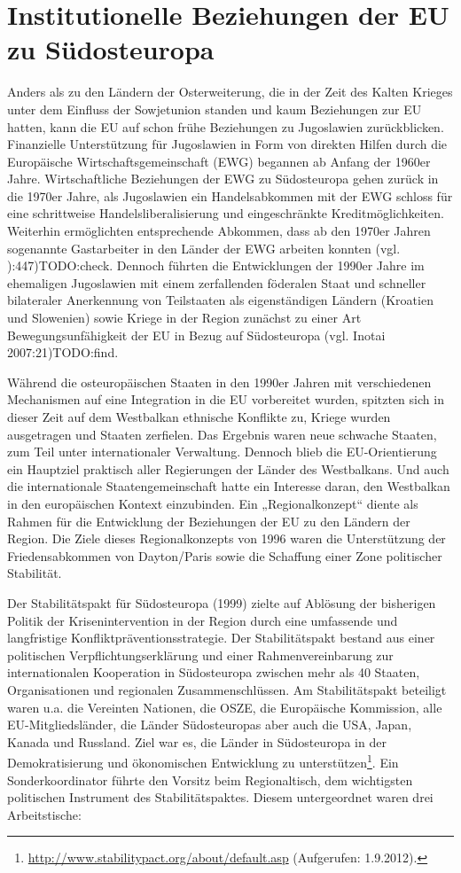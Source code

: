 \section{Institutionelle Beziehungen der EU zu Südosteuropa}
Anders als zu den Ländern der Osterweiterung, die in der Zeit des Kalten Krieges unter dem Einfluss der Sowjetunion standen und kaum Beziehungen zur EU hatten, kann die EU auf schon frühe Beziehungen zu Jugoslawien zurückblicken. Finanzielle Unterstützung für Jugoslawien in Form von direkten Hilfen durch die Europäische Wirtschaftsgemeinschaft (EWG) begannen ab Anfang der 1960er Jahre. Wirtschaftliche Beziehungen der EWG zu Südosteuropa gehen zurück in die 1970er Jahre, als Jugoslawien ein Handelsabkommen mit der EWG schloss für eine schrittweise Handelsliberalisierung und eingeschränkte Kreditmöglichkeiten. Weiterhin ermöglichten entsprechende Abkommen, dass ab den 1970er Jahren sogenannte Gastarbeiter in den Länder der EWG arbeiten konnten (vgl. \cite{weithmann}):447)TODO:check. Dennoch führten die Entwicklungen der 1990er Jahre im ehemaligen Jugoslawien mit einem zerfallenden föderalen Staat und schneller bilateraler Anerkennung von Teilstaaten als eigenständigen Ländern (Kroatien und Slowenien) sowie Kriege in der Region zunächst zu einer Art Bewegungsunfähigkeit der EU in Bezug auf Südosteuropa (vgl. Inotai 2007:21)TODO:find.\par
Während die osteuropäischen Staaten in den 1990er Jahren mit verschiedenen Mechanismen auf eine Integration in die EU vorbereitet wurden, spitzten sich in dieser Zeit auf dem Westbalkan ethnische Konflikte zu, Kriege wurden ausgetragen und Staaten zerfielen. Das Ergebnis waren neue schwache Staaten, zum Teil unter internationaler Verwaltung. Dennoch blieb die EU-Orientierung ein Hauptziel praktisch aller Regierungen der Länder des Westbalkans. Und auch die internationale Staatengemeinschaft hatte ein Interesse daran, den Westbalkan in den europäischen Kontext einzubinden. Ein „Regionalkonzept“ diente als Rahmen für die Entwicklung der Beziehungen der EU zu den Ländern der Region. Die Ziele dieses Regionalkonzepts von 1996 waren die Unterstützung der Friedensabkommen von Dayton/Paris sowie die Schaffung einer Zone politischer Stabilität.\par
Der Stabilitätspakt für Südosteuropa (1999) zielte auf Ablösung der bisherigen Politik der Krisenintervention in der Region durch eine umfassende und langfristige Konfliktpräventionsstrategie. Der Stabilitätspakt bestand aus einer politischen Verpflichtungserklärung und einer Rahmenvereinbarung zur internationalen Kooperation in Südosteuropa zwischen mehr als 40 Staaten, Organisationen und regionalen Zusammenschlüssen. Am Stabilitätspakt beteiligt waren u.a. die Vereinten Nationen, die OSZE, die Europäische Kommission, alle EU-Mitgliedsländer, die Länder Südosteuropas aber auch die USA, Japan, Kanada und Russland. Ziel war es, die Länder in Südosteuropa in der Demokratisierung und ökonomischen Entwicklung zu unterstützen\footnote{\url{http://www.stabilitypact.org/about/default.asp} (Aufgerufen: 1.9.2012).}. Ein Sonderkoordinator führte den Vorsitz beim Regionaltisch, dem wichtigsten politischen Instrument des Stabilitätspaktes. Diesem untergeordnet waren drei Arbeitstische:
